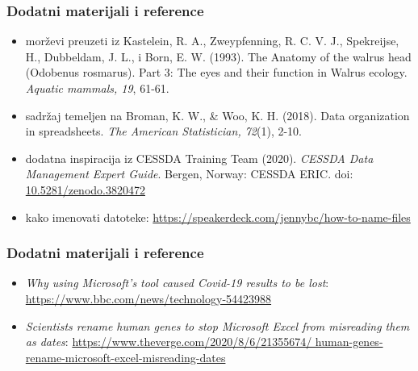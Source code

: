 \documentclass[aspectratio=169]{beamer}
\newenvironment{noheadline}{
    \setbeamertemplate{headline}{}
}{}
\begin{document}
\begin{noheadline}
    \begin{frame}
        \frametitle{Dodatni materijali i reference}

        \fontsize{10}{12}\selectfont

        \begin{itemize}
            \setlength{\itemsep}{1em}
            
            \item morževi preuzeti iz Kastelein, R. A., Zweypfenning, R. C. V.
                J., Spekreijse, H., Dubbeldam, J. L., i Born, E. W. (1993). The
                Anatomy of the walrus head (Odobenus rosmarus). Part 3: The eyes
                and their function in Walrus ecology. \textit{Aquatic mammals, 19},
                61-61.

            \item sadržaj temeljen na Broman, K. W., & Woo, K. H. (2018). Data
                organization in spreadsheets. \textit{The American Statistician,
                72}(1), 2-10.

            \item dodatna inspiracija iz CESSDA Training Team (2020). \textit{CESSDA
                Data Management Expert Guide}. Bergen, Norway: CESSDA ERIC. doi:
                \url{10.5281/zenodo.3820472}

            \item kako imenovati datoteke:
                \url{https://speakerdeck.com/jennybc/how-to-name-files}
            
        \end{itemize}
    \end{frame}
\end{noheadline}

\begin{noheadline}
    \begin{frame}
        \frametitle{Dodatni materijali i reference}

        \fontsize{10}{12}\selectfont

        \begin{itemize}
            \setlength{\itemsep}{1em}

            \item \textit{Why using Microsoft's tool caused Covid-19 results to
                be lost}: \url{https://www.bbc.com/news/technology-54423988}

            \item \textit{Scientists rename human genes to stop Microsoft Excel
                from misreading them as dates}:
                \url{https://www.theverge.com/2020/8/6/21355674/
                human-genes-rename-microsoft-excel-misreading-dates}
            
        \end{itemize}
    \end{frame}
\end{noheadline}
\end{document}

